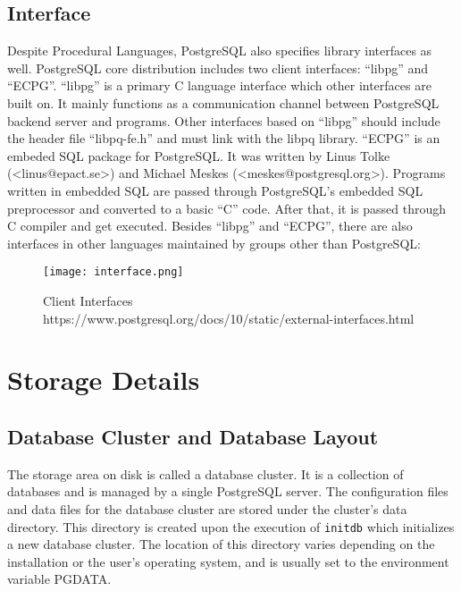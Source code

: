 \documentclass[a4paper]{article}
\begin{document}
\subsection{Interface}
Despite Procedural Languages, PostgreSQL also specifies library interfaces as well. PostgreSQL core distribution includes two client interfaces: ``libpg'' and ``ECPG''. ``libpg'' is a primary C language interface which other interfaces are built on. It mainly functions as a communication channel between PostgreSQL backend server and programs. Other interfaces based on ``libpg'' should include the header file ``libpq-fe.h'' and must link with the libpq library.\cite{1} ``ECPG'' is an embeded SQL package for PostgreSQL. It was written by Linus Tolke (<linus@epact.se>) and Michael Meskes (<meskes@postgresql.org>).\cite{1} Programs written in embedded SQL are passed through PostgreSQL's embedded SQL preprocessor and converted to a basic ``C'' code. After that, it is passed through C compiler and get executed. Besides ``libpg'' and ``ECPG'', there are also interfaces in other languages maintained by groups other than PostgreSQL:
\begin{figure}[H]
\centering
\texttt{[image: interface.png]}
\caption{Client Interfaces\\https://www.postgresql.org/docs/10/static/external-interfaces.html}
\end{figure}

\section{Storage Details}
\subsection{Database Cluster and Database Layout}

The storage area on disk is called a database cluster. It is a collection of databases and is managed by a single PostgreSQL server. The configuration files and data files for the database cluster are stored under the cluster’s data directory. This directory is created upon the execution of \texttt{initdb} which initializes a new database cluster. The location of this directory varies depending on the installation or the user’s operating system, and is usually set to the environment variable PGDATA.
\end{document}
